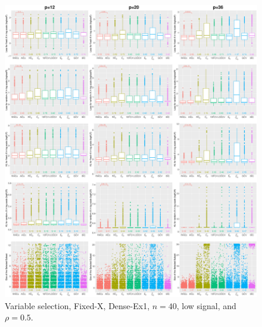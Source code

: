 \begin{figure}[!ht]
\centering
\includegraphics[width=\textwidth]{figures/supplement/fixedx/subset_selection/Dense-Ex1_n40_lsnr_rho05.eps}
\caption{Variable selection, Fixed-X, Dense-Ex1, $n=40$, low signal, and $\rho=0.5$.}
\end{figure}
\clearpage
